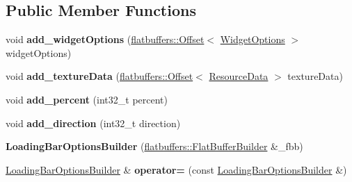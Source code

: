 \subsection*{Public Member Functions}
\begin{DoxyCompactItemize}
\item 
\mbox{\label{structflatbuffers_1_1LoadingBarOptionsBuilder_adf0a769841db4f139700bb84e4b49f47}} 
void {\bfseries add\+\_\+widget\+Options} (\hyperlink{structflatbuffers_1_1Offset}{flatbuffers\+::\+Offset}$<$ \hyperlink{structflatbuffers_1_1WidgetOptions}{Widget\+Options} $>$ widget\+Options)
\item 
\mbox{\label{structflatbuffers_1_1LoadingBarOptionsBuilder_a7d77c5fe41baf2930ab4a0792b44b970}} 
void {\bfseries add\+\_\+texture\+Data} (\hyperlink{structflatbuffers_1_1Offset}{flatbuffers\+::\+Offset}$<$ \hyperlink{structflatbuffers_1_1ResourceData}{Resource\+Data} $>$ texture\+Data)
\item 
\mbox{\label{structflatbuffers_1_1LoadingBarOptionsBuilder_ae08a302dd3662cc70126420715987d9a}} 
void {\bfseries add\+\_\+percent} (int32\+\_\+t percent)
\item 
\mbox{\label{structflatbuffers_1_1LoadingBarOptionsBuilder_aad38e11cda74ddb26fddcc98b4f7d4e3}} 
void {\bfseries add\+\_\+direction} (int32\+\_\+t direction)
\item 
\mbox{\label{structflatbuffers_1_1LoadingBarOptionsBuilder_a694cae599e5ed176c2c3f688d9467681}} 
{\bfseries Loading\+Bar\+Options\+Builder} (\hyperlink{classflatbuffers_1_1FlatBufferBuilder}{flatbuffers\+::\+Flat\+Buffer\+Builder} \&\+\_\+fbb)
\item 
\mbox{\label{structflatbuffers_1_1LoadingBarOptionsBuilder_ae1a179986c68257d8eecf4296600ee45}} 
\hyperlink{structflatbuffers_1_1LoadingBarOptionsBuilder}{Loading\+Bar\+Options\+Builder} \& {\bfseries operator=} (const \hyperlink{structflatbuffers_1_1LoadingBarOptionsBuilder}{Loading\+Bar\+Options\+Builder} \&)
\item 
\mbox{\label{structflatbuffers_1_1LoadingBarOptionsBuilder_a6832ecb93000ebbe1f6088d7c3691695}} 

\end{DoxyCompactItemize}
